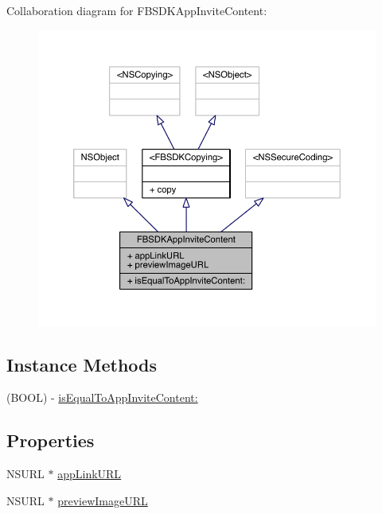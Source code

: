 Collaboration diagram for F\-B\-S\-D\-K\-App\-Invite\-Content\-:
\nopagebreak
\begin{figure}[H]
\begin{center}
\leavevmode
\includegraphics[width=350pt]{interface_f_b_s_d_k_app_invite_content__coll__graph}
\end{center}
\end{figure}
\subsection*{Instance Methods}
\begin{DoxyCompactItemize}
\item 
(B\-O\-O\-L) -\/ \hyperlink{interface_f_b_s_d_k_app_invite_content_a297fb76a966893c2c8539b1630173ee5}{is\-Equal\-To\-App\-Invite\-Content\-:}
\end{DoxyCompactItemize}
\subsection*{Properties}
\begin{DoxyCompactItemize}
\item 
N\-S\-U\-R\-L $\ast$ \hyperlink{interface_f_b_s_d_k_app_invite_content_adfea27af374a17dc3a0565f9d4f7cda8}{app\-Link\-U\-R\-L}
\item 
N\-S\-U\-R\-L $\ast$ \hyperlink{interface_f_b_s_d_k_app_invite_content_ac25904924b74d53be16f84df048d16b5}{preview\-Image\-U\-R\-L}
\end{DoxyCompactItemize}


